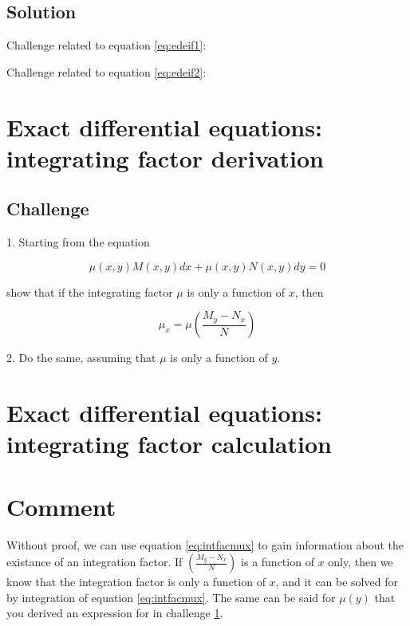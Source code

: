 \subsection*{Solution}
Challenge related to equation \ref{eq:edeif1}: 

Challenge related to equation \ref{eq:edeif2}: 

\timebox




\newpage
\section{Exact differential equations: integrating factor derivation}
\label{sec:intfacderiv}

\subsection*{Challenge}
1. Starting from the equation

\begin{equation}
    \mu(x,y) M(x,y) dx + \mu(x,y) N(x,y) dy = 0
\end{equation}

show that if the integrating factor $\mu$ is only a function of $x$, then

\begin{equation}
    \label{eq:intfacmux}
    \mu_x = \mu \left ( \frac{M_y-N_x}{N} \right )
\end{equation}

2. Do the same, assuming that $\mu$ is only a function of $y$.


\timebox




\newpage
\section{Exact differential equations: integrating factor calculation}
\label{sec:edeifcalc}

\section*{Comment}
Without proof, we can use equation \ref{eq:intfacmux} to gain information about the existance of an integration factor. If $\left ( \frac{M_y-N_x}{N} \right )$ is a function of $x$ only, then we know that the integration factor is only a function of $x$, and it can be solved for by integration of equation \ref{eq:intfacmux}. The same can be said for $\mu(y)$ that you derived an expression for in challenge \ref{sec:intfacderiv}.

